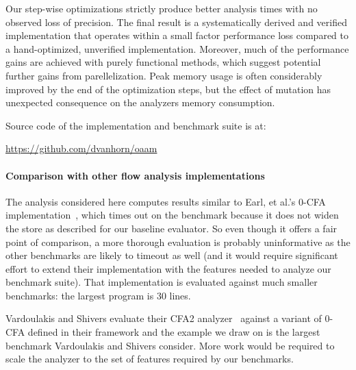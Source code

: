 \documentclass[preprint,onecolumn,9pt]{sigplanconf} %
\begin{document}
Our step-wise optimizations strictly produce better analysis times
with no observed loss of precision.  The final result is a
systematically derived and verified implementation that operates
within a small factor performance loss compared to a hand-optimized,
unverified implementation.  Moreover, much of the performance gains
are achieved with purely functional methods, which suggest potential
further gains from parellelization.  Peak memory usage is often
considerably improved by the end of the optimization steps, but the
effect of mutation has unexpected consequence on the analyzers memory
consumption.


Source code of the implementation and benchmark suite is at:

\begin{center}
\url{https://github.com/dvanhorn/oaam}
\end{center}

\paragraph{Comparison with other flow analysis implementations}

The analysis considered here computes results similar to Earl, et al.'s
0-CFA implementation~\cite{dvanhorn:Earl2012Introspective}, which
times out on the \Church{} benchmark because it does not widen the
store as described for our baseline evaluator.  So even though it
offers a fair point of comparison, a more thorough evaluation is
probably uninformative as the other benchmarks are likely to timeout
as well (and it would require significant effort to extend their
implementation with the features needed to analyze our benchmark
suite).  That implementation is evaluated against much smaller
benchmarks: the largest program is 30 lines.

Vardoulakis and Shivers evaluate their CFA2
analyzer~\cite{dvanhorn:Vardoulakis2011CFA2} against a variant of
0-CFA defined in their framework and the example we draw on is the
largest benchmark Vardoulakis and Shivers consider.  More work would
be required to scale the analyzer to the set of features required by
our benchmarks.
\end{document}
